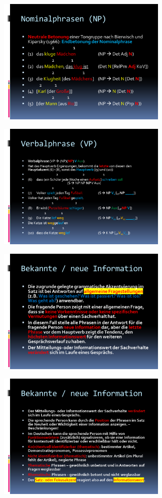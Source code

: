 \documentclass[
  letterpaper,
]{scrbook}
\begin{document}
\includegraphics[width=3.2in,height=\textheight]{./pictures/satzakzentuierung/satzakzent_Diapozitiv2.PNG}

\includegraphics[width=3.2in,height=\textheight]{./pictures/satzakzentuierung/satzakzent_Diapozitiv3.PNG}

\includegraphics[width=3.2in,height=\textheight]{./pictures/satzakzentuierung/satzakzent_Diapozitiv4.PNG}

\includegraphics[width=3.2in,height=\textheight]{./pictures/satzakzentuierung/satzakzent_Diapozitiv5.PNG}
\end{document}
